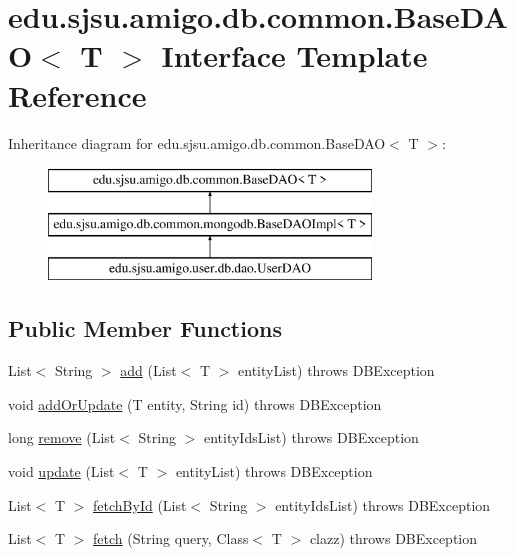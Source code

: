 \hypertarget{interfaceedu_1_1sjsu_1_1amigo_1_1db_1_1common_1_1_base_d_a_o}{}\section{edu.\+sjsu.\+amigo.\+db.\+common.\+Base\+D\+AO$<$ T $>$ Interface Template Reference}
\label{interfaceedu_1_1sjsu_1_1amigo_1_1db_1_1common_1_1_base_d_a_o}
Inheritance diagram for edu.\+sjsu.\+amigo.\+db.\+common.\+Base\+D\+AO$<$ T $>$\+:\begin{figure}[H]
\begin{center}
\leavevmode
\includegraphics[height=3.000000cm]{interfaceedu_1_1sjsu_1_1amigo_1_1db_1_1common_1_1_base_d_a_o}
\end{center}
\end{figure}
\subsection*{Public Member Functions}
\begin{DoxyCompactItemize}
\item 
List$<$ String $>$ \hyperlink{interfaceedu_1_1sjsu_1_1amigo_1_1db_1_1common_1_1_base_d_a_o_abee308a0e83d8e5a42f202dfc195d72c}{add} (List$<$ T $>$ entity\+List)  throws D\+B\+Exception
\item 
void \hyperlink{interfaceedu_1_1sjsu_1_1amigo_1_1db_1_1common_1_1_base_d_a_o_a73dbf1e946ba180be688bc14d69cff88}{add\+Or\+Update} (T entity, String id)  throws D\+B\+Exception
\item 
long \hyperlink{interfaceedu_1_1sjsu_1_1amigo_1_1db_1_1common_1_1_base_d_a_o_ad41557807ba9feaeebff9705ce68478d}{remove} (List$<$ String $>$ entity\+Ids\+List)  throws D\+B\+Exception
\item 
void \hyperlink{interfaceedu_1_1sjsu_1_1amigo_1_1db_1_1common_1_1_base_d_a_o_a8204c75fed7b773eafba11a6a7d9d689}{update} (List$<$ T $>$ entity\+List)  throws D\+B\+Exception
\item 
List$<$ T $>$ \hyperlink{interfaceedu_1_1sjsu_1_1amigo_1_1db_1_1common_1_1_base_d_a_o_a37db1a13eee71618f11b7e07d3b13ac4}{fetch\+By\+Id} (List$<$ String $>$ entity\+Ids\+List)  throws D\+B\+Exception
\item 
List$<$ T $>$ \hyperlink{interfaceedu_1_1sjsu_1_1amigo_1_1db_1_1common_1_1_base_d_a_o_acae47af1542a0d62e801ef3a458876e0}{fetch} (String query, Class$<$ T $>$ clazz)  throws D\+B\+Exception
\end{DoxyCompactItemize}


